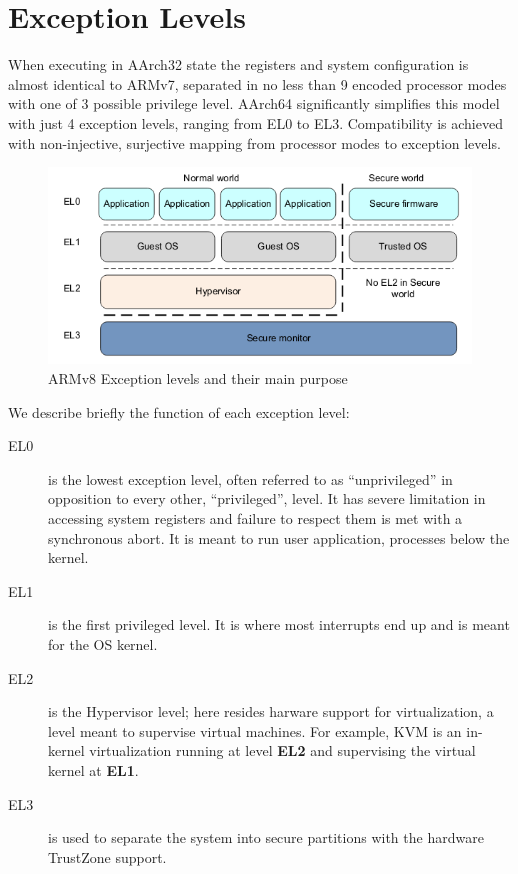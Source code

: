 \documentclass[12pt,a4paper,openright,twoside]{report}
\begin{document}
\section{Exception Levels}
When executing in AArch32 state the registers and system configuration is almost
identical to ARMv7, separated in no less than 9 encoded processor modes with one
of 3 possible privilege level. AArch64 significantly simplifies this model with
just 4 exception levels, ranging from EL0 to EL3. Compatibility is achieved with 
non-injective, surjective mapping from processor modes to exception levels.

\begin{figure}[t]
    \begin{center}
\includegraphics[scale=0.6]{images/tesi7.png}
\caption[ARMv8 Exception Levels]{ARMv8 Exception levels and their main purpose}\label{fig:armv8el}
    \end{center}
\end{figure}

We describe briefly the function of each exception level:
\begin{description}
    \item[EL0] is the lowest exception level, often referred to as ``unprivileged''
        in opposition to every other, ``privileged'', level. It has severe 
        limitation in accessing system registers and failure to respect them
        is met with a synchronous abort. It is meant to run user application, 
        processes below the kernel.
    \item[EL1] is the first privileged level. It is where most interrupts end
        up and is meant for the OS kernel.
    \item[EL2] is the Hypervisor level; here resides harware support for virtualization,
        a level meant to supervise virtual machines. For example, KVM is an in-kernel
        virtualization running at level \textbf{EL2} and supervising the virtual kernel 
        at \textbf{EL1}.
    \item[EL3] is used to separate the system into secure partitions with the
        hardware TrustZone support.
\end{description}
\end{document}
